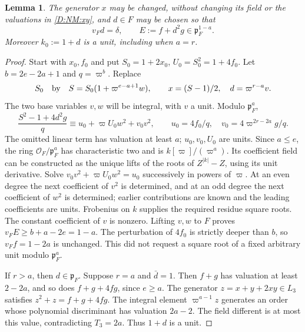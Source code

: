 \documentclass[11pt]{amsart}
\newtheorem{lemma}[theorem]{Lemma}
\theoremstyle{definition}
\theoremstyle{remark}
\newcommand{\OO}{\mathcal O}\newcommand{\pp}{\mathfrak p}\newcommand{\PP}{\mathfrak P}
\begin{document}
\begin{lemma}\label{D:NM:alignment}
The generator $x$ may be changed, without changing its field or the
valuations in \eqref{D:NM:xy}, and $d\in F$ may be chosen so that
\begin{equation}\label{D:NM:align}
 v_Fd=\delta,\qquad E:=f+d^2g\in\pp_F^{1-a}.
\end{equation}
Moreover $k_0:=1+d$ is a unit, including when $a=r$.
\end{lemma}
\begin{proof}
Start with $x_0,f_0$ and put $S_0=1+2x_0$, $U_0=S_0^2=1+4f_0$.
Let $b=2e-2a+1$ and $q=\varpi^b$. Replace
\[
 S_0\quad\hbox{by}\quad S=S_0(1+\varpi^{e-a+1}w),\qquad x=(S-1)/2,
 \quad d=\varpi^{r-a}v.
\]
The two base variables $v,w$ will be integral, with $v$ a unit.
Modulo $\pp_F^a$,
\[
 \frac{S^2-1+4d^2g}{q}
 \equiv u_0+\varpi U_0w^2+v_0v^2,
 \qquad u_0=4f_0/q,\quad v_0=4\varpi^{2r-2a}g/q.
\]
The omitted linear term has valuation at least $a$; $u_0,v_0,U_0$ are
units. Since $a\le e$, the ring $\OO_F/\pp_F^a$ has characteristic two
and is $k[\varpi]/(\varpi^a)$. Its coefficient field can be constructed
as the unique lifts of the roots of $Z^{|k|}-Z$, using its unit derivative.
Solve $v_0v^2+\varpi U_0w^2=u_0$ successively in powers of $\varpi$.
At an even degree the next coefficient of $v^2$ is determined, and at
an odd degree the next coefficient of $w^2$ is determined; earlier
contributions are known and the leading coefficients are units.
Frobenius on $k$ supplies the required residue square roots. The constant
coefficient of $v$ is nonzero. Lifting $v,w$ to $F$ proves
$v_F E\ge b+a-2e=1-a$. The perturbation of $4f_0$ is strictly deeper
than $b$, so $v_Ff=1-2a$ is unchanged. This did not request a square
root of a fixed arbitrary unit modulo $\pp_F^a$.

If $r>a$, then $d\in\pp_F$. Suppose $r=a$ and $\bar d=1$.
Then $f+g$ has valuation at least $2-2a$, and so does
$f+g+4fg$, since $e\ge a$. The generator
$z=x+y+2xy\in L_3$ satisfies $z^2+z=f+g+4fg$.
The integral element $\varpi^{a-1}z$ generates an order whose
polynomial discriminant has valuation $2a-2$. The field different is
at most this value, contradicting $T_3=2a$. Thus $1+d$ is a unit.
\end{proof}
\end{document}
